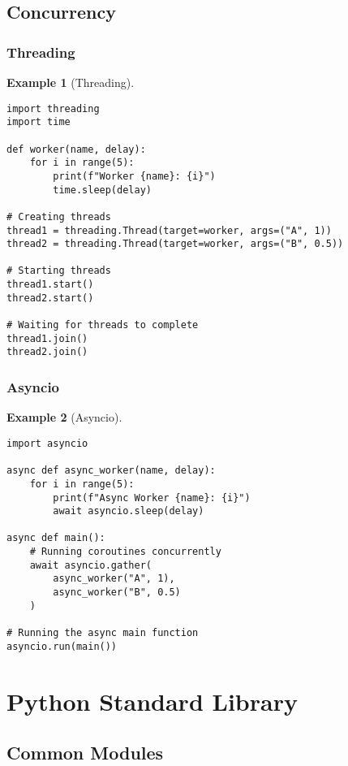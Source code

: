 \documentclass[11pt]{article}
\newtheorem{example}{Example}[section]
\begin{document}
\subsection{Concurrency}

\subsubsection{Threading}

\begin{example}[Threading]
\begin{lstlisting}
import threading
import time

def worker(name, delay):
    for i in range(5):
        print(f"Worker {name}: {i}")
        time.sleep(delay)

# Creating threads
thread1 = threading.Thread(target=worker, args=("A", 1))
thread2 = threading.Thread(target=worker, args=("B", 0.5))

# Starting threads
thread1.start()
thread2.start()

# Waiting for threads to complete
thread1.join()
thread2.join()
\end{lstlisting}
\end{example}

\subsubsection{Asyncio}

\begin{example}[Asyncio]
\begin{lstlisting}
import asyncio

async def async_worker(name, delay):
    for i in range(5):
        print(f"Async Worker {name}: {i}")
        await asyncio.sleep(delay)

async def main():
    # Running coroutines concurrently
    await asyncio.gather(
        async_worker("A", 1),
        async_worker("B", 0.5)
    )

# Running the async main function
asyncio.run(main())
\end{lstlisting}
\end{example}

\section{Python Standard Library}

\subsection{Common Modules}
\end{document}
